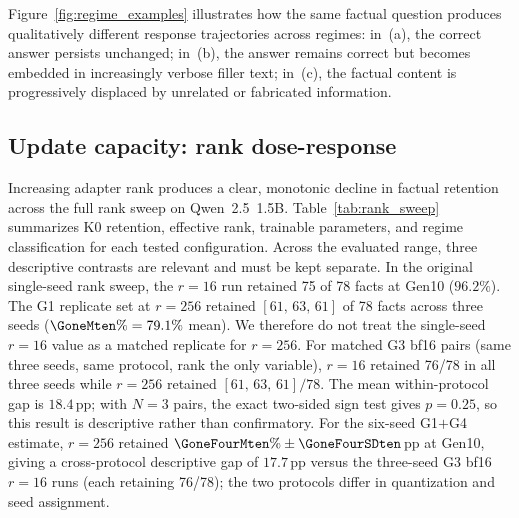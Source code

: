 \documentclass[a4paper,fleqn]{cas-dc}
\newif\ifshowchanges
\newcommand{\rev}[1]{\ifshowchanges{\color{blue}#1}\else{#1}\fi}
\begin{document}
Figure~\ref{fig:regime_examples} illustrates how the same factual question
produces qualitatively different response trajectories across regimes: in~(a),
the correct answer persists unchanged; in~(b), the answer remains correct but
becomes embedded in increasingly verbose filler text; in~(c), the factual
content is progressively displaced by unrelated or fabricated information.

\subsection{Update capacity: rank dose-response}\label{sec:res_capacity}

Increasing adapter rank produces a clear, monotonic decline in factual retention
across the full rank sweep on Qwen~2.5~1.5B.
Table~\ref{tab:rank_sweep} summarizes K0 retention, effective rank, trainable
parameters, and regime classification for each tested configuration. Across the evaluated range, three descriptive contrasts are relevant and must be kept separate.
\rev{In the original single-seed rank sweep, the $r=16$ run retained 75 of 78
facts at Gen10 ($96.2\%$). The G1 replicate set at $r=256$ retained
$[61,\,63,\,61]$ of 78 facts across three seeds ($\GoneMten\% = 79.1\%$
mean). We therefore do not treat the single-seed $r=16$ value as a matched
replicate for $r=256$.}
\rev{For matched G3 bf16 pairs (same three seeds, same protocol, rank the only
variable), $r=16$ retained 76/78 in all three seeds while $r=256$ retained
$[61,\,63,\,61]/78$. The mean within-protocol gap is $18.4$\,pp; with $N{=}3$
pairs, the exact two-sided sign test gives $p{=}0.25$, so this result is
descriptive rather than confirmatory.}
\rev{For the six-seed G1$+$G4 estimate, $r=256$ retained
$\GoneFourMten\%\pm\GoneFourSDten$\,pp at Gen10, giving a cross-protocol
descriptive gap of $17.7$\,pp versus the three-seed G3 bf16 $r=16$ runs (each retaining 76/78); the two
protocols differ in quantization and seed assignment.}
\end{document}
